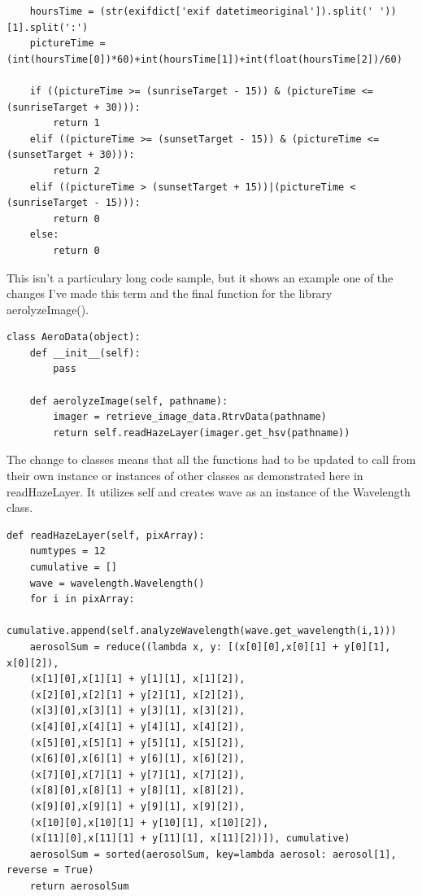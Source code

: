 \documentclass[onecolumn, draftclsnofoot,10pt, compsoc]{IEEEtran}
\begin{document}
\begin{singlespace}
\begin{lstlisting}
	hoursTime = (str(exifdict['exif datetimeoriginal']).split(' '))[1].split(':')
	pictureTime = (int(hoursTime[0])*60)+int(hoursTime[1])+int(float(hoursTime[2])/60)

	if ((pictureTime >= (sunriseTarget - 15)) & (pictureTime <= (sunriseTarget + 30))):
		return 1
	elif ((pictureTime >= (sunsetTarget - 15)) & (pictureTime <= (sunsetTarget + 30))):
		return 2
	elif ((pictureTime > (sunsetTarget + 15))|(pictureTime < (sunriseTarget - 15))):
		return 0
	else:
		return 0
			\end{lstlisting}
			This isn't a particulary long code sample, but it shows an example one of the changes I've made this term and the final function for the library aerolyzeImage().
	\begin{lstlisting}
class AeroData(object):
	def __init__(self):
		pass

	def aerolyzeImage(self, pathname):
		imager = retrieve_image_data.RtrvData(pathname)
		return self.readHazeLayer(imager.get_hsv(pathname))
	\end{lstlisting}
			The change to classes means that all the functions had to be updated to call from their own instance or instances of other classes as demonstrated here in readHazeLayer. It utilizes self and creates wave as an instance of the Wavelength class.
			\begin{lstlisting}
def readHazeLayer(self, pixArray):
	numtypes = 12
	cumulative = []
	wave = wavelength.Wavelength()
	for i in pixArray:
			cumulative.append(self.analyzeWavelength(wave.get_wavelength(i,1)))
	aerosolSum = reduce((lambda x, y: [(x[0][0],x[0][1] + y[0][1], x[0][2]),
	(x[1][0],x[1][1] + y[1][1], x[1][2]),
	(x[2][0],x[2][1] + y[2][1], x[2][2]),
	(x[3][0],x[3][1] + y[3][1], x[3][2]),
	(x[4][0],x[4][1] + y[4][1], x[4][2]),
	(x[5][0],x[5][1] + y[5][1], x[5][2]),
	(x[6][0],x[6][1] + y[6][1], x[6][2]),
	(x[7][0],x[7][1] + y[7][1], x[7][2]),
	(x[8][0],x[8][1] + y[8][1], x[8][2]),
	(x[9][0],x[9][1] + y[9][1], x[9][2]),
	(x[10][0],x[10][1] + y[10][1], x[10][2]),
	(x[11][0],x[11][1] + y[11][1], x[11][2])]), cumulative)
	aerosolSum = sorted(aerosolSum, key=lambda aerosol: aerosol[1], reverse = True)
	return aerosolSum
			\end{lstlisting}
\end{singlespace}
\clearpage


\end{document}
